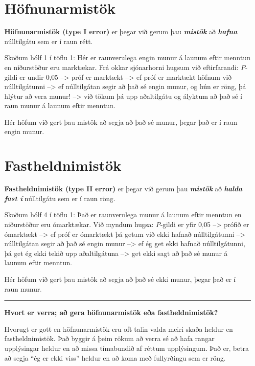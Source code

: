 \documentclass[
]{book}
\begin{document}
\hypertarget{huxf6fnunarmistuxf6k}{%
\section{Höfnunarmistök}\label{huxf6fnunarmistuxf6k}}

\textbf{Höfnunarmistök (type I error)} er þegar við gerum þau \textbf{\emph{mistök}} að \textbf{\emph{hafna}} núlltilgátu sem er í raun rétt.

Skoðum hólf 1 í töflu 1: Hér er raunverulega engin munur á launum eftir menntun en niðurstöður eru marktækar. Frá okkar sjónarhorni hugsum við eftirfarandi: \emph{P}-gildi er undir 0,05 --\textgreater{} próf er marktækt --\textgreater{} ef próf er marktækt höfnum við núlltilgátunni --\textgreater{} ef núlltilgátan segir að það sé engin munur, og hún er röng, þá hlýtur að vera munur! --\textgreater{} við tökum þá upp aðaltilgátu og ályktum að það sé í raun munur á launum eftir menntun.

Hér höfum við gert þau mistök að segja að það sé munur, þegar það er í raun engin munur.

\hypertarget{fastheldnimistuxf6k}{%
\section{Fastheldnimistök}\label{fastheldnimistuxf6k}}

\textbf{Fastheldnimistök (type II error)} er þegar við gerum þau \textbf{\emph{mistök}} að \textbf{\emph{halda fast í}} núlltilgátu sem er í raun röng.

Skoðum hólf 4 í töflu 1: Það er raunverulega munur á launum eftir menntun en niðurstöður eru ómarktækar. Við myndum hugsa: \emph{P}-gildi er yfir 0,05 --\textgreater{} prófið er ómarktækt --\textgreater{} ef próf er ómarktækt þá getum við ekki hafnað núlltilgátunni --\textgreater{} núlltilgátan segir að það sé engin munur --\textgreater{} ef ég get ekki hafnað núlltilgátunni, þá get ég ekki tekið upp aðaltilgátuna --\textgreater{} get ekki sagt að það sé munur á launum eftir menntun.

Hér höfum við gert þau mistök að segja að það sé ekki munur, þegar það er í raun munur.

\begin{center}\rule{0.5\linewidth}{0.5pt}\end{center}

\textbf{Hvort er verra; að gera höfnunarmistök eða fastheldnimistök?}

Hvorugt er gott en höfnunarmistök eru oft talin valda meiri skaða heldur en fastheldnimistök. Það byggir á þeim rökum að verra sé að hafa rangar upplýsingar heldur en að missa tímabundið af réttum upplýsingum. Það er, betra að segja ``ég er ekki viss'' heldur en að koma með fullyrðingu sem er röng.
\end{document}
